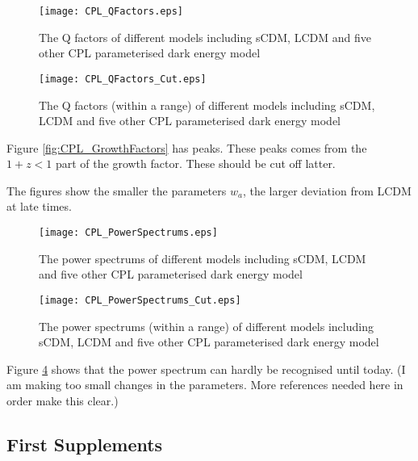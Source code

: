 \begin{figure}[!htbp]
\centering
\texttt{[image: CPL\_QFactors.eps]}
\caption{The Q factors of different models including sCDM, LCDM and five other CPL parameterised dark energy model}\label{fig:CPL_QFactors}
\end{figure}





\begin{figure}[!htbp]
\centering
\texttt{[image: CPL\_QFactors\_Cut.eps]}
\caption{The Q factors (within a range) of different models including sCDM, LCDM and five other CPL parameterised dark energy model}\label{fig:CPL_QFactors_Cut}
\end{figure}

Figure \ref{fig:CPL_GrowthFactors} has peaks. These peaks comes from the $1+z<1$ part of the growth factor. These should be cut off latter.

The figures show the smaller the parameters $w_a$, the larger deviation from LCDM at late times.




\begin{figure}[!htbp]
\centering
\texttt{[image: CPL\_PowerSpectrums.eps]}
\caption{The power spectrums of different models including sCDM, LCDM and five other CPL parameterised dark energy model}\label{fig:CPL_PowerSpectrums}
\end{figure}





\begin{figure}[!htbp]
\centering
\texttt{[image: CPL\_PowerSpectrums\_Cut.eps]}
\caption{The power spectrums (within a range) of different models including sCDM, LCDM and five other CPL parameterised dark energy model}\label{fig:CPL_PowerSpectrums_Cut}
\end{figure}





Figure \ref{fig:CPL_PowerSpectrums_Cut} shows that the power spectrum can hardly be recognised until today. (I am making too small changes in the parameters. More references needed here in order make this clear.)








\subsection{\color{blue}First Supplements}


